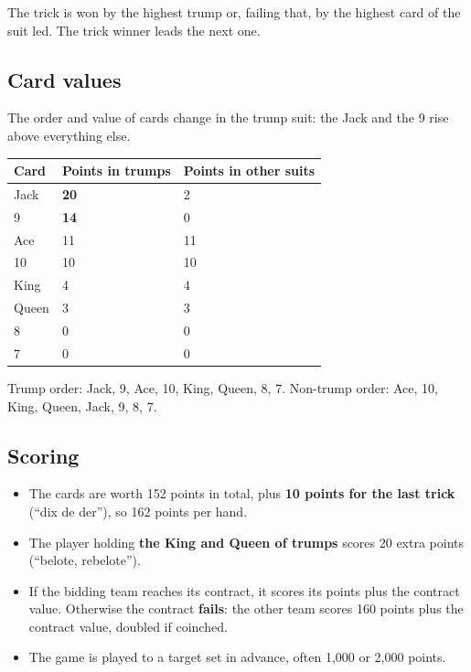 The trick is won by the highest trump or, failing that, by the highest card of the suit led. The trick winner leads the next one.

\subsection*{Card values}

The order and value of cards change in the trump suit: the Jack and the 9 rise above everything else.

\begin{table}[htbp]\centering\small\begin{tabular}{lll}\toprule

Card & Points in trumps & Points in other suits \\\midrule

Jack & \textbf{20} & 2 \\

9 & \textbf{14} & 0 \\

Ace & 11 & 11 \\

10 & 10 & 10 \\

King & 4 & 4 \\

Queen & 3 & 3 \\

8 & 0 & 0 \\

7 & 0 & 0 \\

\bottomrule\end{tabular}\end{table}

Trump order: Jack, 9, Ace, 10, King, Queen, 8, 7. Non-trump order: Ace, 10, King, Queen, Jack, 9, 8, 7.

\subsection*{Scoring}

\begin{itemize}

  \item The cards are worth 152 points in total, plus \textbf{10 points for the last trick} (``dix de der''), so 162 points per hand.

  \item The player holding \textbf{the King and Queen of trumps} scores 20 extra points (``belote, rebelote'').

  \item If the bidding team reaches its contract, it scores its points plus the contract value. Otherwise the contract \textbf{fails}: the other team scores 160 points plus the contract value, doubled if coinched.

  \item The game is played to a target set in advance, often 1,000 or 2,000 points.

\end{itemize}


